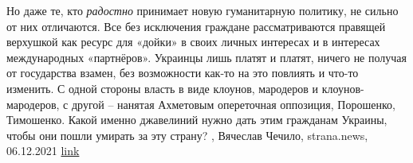 Но даже те, кто \emph{радостно} принимает новую гуманитарную политику, не сильно от
них отличаются. Все без исключения граждане рассматриваются правящей верхушкой
как ресурс для «дойки» в своих личных интересах и в интересах международных
«партнёров». Украинцы лишь платят и платят, ничего не получая от государства
взамен, без возможности как-то на это повлиять и что-то изменить. С одной
стороны власть в виде клоунов, мародеров и клоунов-мародеров, с другой –
нанятая Ахметовым опереточная оппозиция, Порошенко, Тимошенко.  Какой именно
джавелиний нужно дать этим гражданам Украины, чтобы они пошли умирать за эту
страну?
, 
Вячеслав Чечило, strana.news, 06.12.2021
\href{https://strana.news/opinions/365636-chuvstvujut-li-hrazhdane-ukrainy-etu-stranu-svoej.html}{link}
